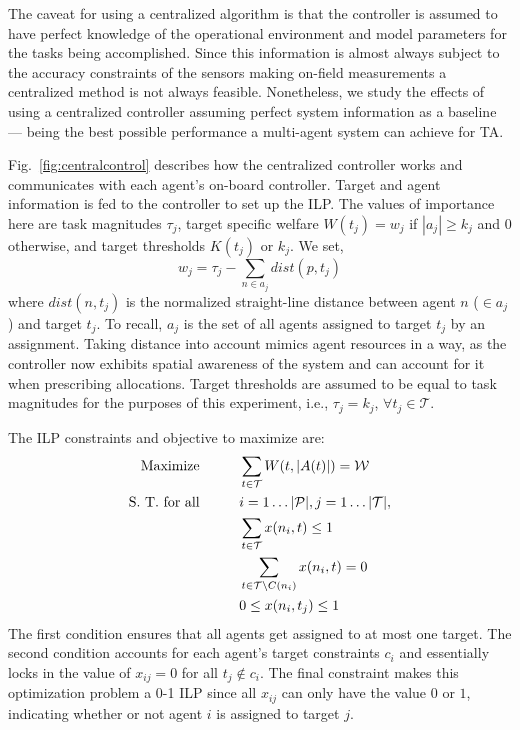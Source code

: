 \documentclass[defaultstyle,12pt]{thesis}
\newcommand{\Pl}{\mathcal{P}} %
\newcommand{\Ta}{\mathcal{T}} %
\newcommand{\We}{\mathcal{W}} %
\begin{document}
The caveat for using a centralized algorithm is that the controller is assumed to have perfect knowledge of the operational environment and model parameters for the tasks being accomplished. Since this information is almost always subject to the accuracy constraints of the sensors making on-field measurements a centralized method is not always feasible. Nonetheless, we study the effects of using a centralized controller assuming perfect system information as a baseline --- being the best possible performance a multi-agent system can achieve for TA.

Fig.~\ref{fig:centralcontrol} describes how the centralized controller works and communicates with each agent's on-board controller. Target and agent information is fed to the controller to set up the ILP. The values of importance here are task magnitudes $\tau_j$, target specific welfare $W(t_j) = w_j$ if $|a_j| \geq k_j$ and $0$ otherwise, and target thresholds $K(t_j)$ or $k_j$. We set,
\begin{equation*}
	w_j = \tau_j - \sum\limits_{n \in a_j} dist(p, t_j)
\end{equation*}
where $dist(n,t_j)$ is the normalized straight-line distance between agent $n$ ($\in a_j$) and target $t_j$. To recall, $a_j$ is the set of all agents assigned to target $t_j$ by an assignment. Taking distance into account mimics agent resources in a way, as the controller now exhibits spatial awareness of the system and can account for it when prescribing allocations. Target thresholds are assumed to be equal to task magnitudes for the purposes of this experiment, i.e., $\tau_j = k_j$, $\forall t_j \in \Ta$. 

The ILP constraints and objective to maximize are:
\begin{align}\label{eq:ilp}
	\text{Maximize}\hspace{1cm} & \sum\limits_{t \in \Ta} W(t, |A(t)|) = \We\\
	\text{S. T. for all}\hspace{1cm} & i = 1\ldots|\Pl|, j = 1\ldots|\Ta|,\notag\\
	& \sum\limits_{t \in \Ta} x(n_i, t) \leq 1\notag\\
	& \sum\limits_{t \in \Ta \backslash C(n_i)} x(n_i, t) = 0\notag\\
	& 0 \leq x(n_i, t_j) \leq 1\notag
\end{align}
The first condition ensures that all agents get assigned to at most one target. The second condition accounts for each agent's target constraints $c_i$ and essentially locks in the value of $x_{ij} = 0$ for all $t_j \not\in c_i$. The final constraint makes this optimization problem a 0-1 ILP since all $x_{ij}$ can only have the value $0$ or $1$, indicating whether or not agent $i$ is assigned to target $j$.
\end{document}
